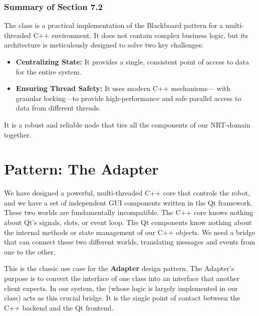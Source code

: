 \subsubsection{Summary of Section 7.2}
\label{subsubsec:section7-2-summary}
The  class is a practical implementation of the Blackboard pattern for a multi-threaded C++ environment. It does not contain complex business logic, but its architecture is meticulously designed to solve two key challenges:
\begin{itemize}
    \item \textbf{Centralizing State:} It provides a single, consistent point of access to data for the entire system.
    \item \textbf{Ensuring Thread Safety:} It uses modern C++ mechanisms— with granular locking—to provide high-performance and safe parallel access to data from different threads.
\end{itemize}
It is a robust and reliable node that ties all the components of our NRT-domain together.



\section{Pattern: The Adapter}
\label{sec:pattern_adapter}

We have designed a powerful, multi-threaded C++ core that controls the robot, and we have a set of independent GUI components written in the Qt framework. These two worlds are fundamentally incompatible. The C++ core knows nothing about Qt's signals, slots, or event loop. The Qt components know nothing about the internal methods or state management of our C++ objects. We need a bridge that can connect these two different worlds, translating messages and events from one to the other.

This is the classic use case for the \textbf{Adapter} design pattern. The Adapter's purpose is to convert the interface of one class into an interface that another client expects. In our system, the \textbf{} (whose logic is largely implemented in our  class) acts as this crucial bridge. It is the single point of contact between the C++ backend and the Qt frontend.

